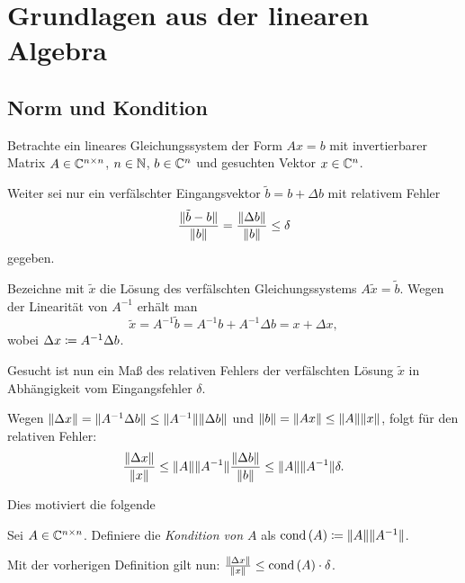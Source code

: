\chapter{Grundlagen aus der linearen Algebra}
\section{Norm und Kondition}

Betrachte ein lineares Gleichungssystem der Form
$Ax = b$ mit invertierbarer Matrix
$A \in \mathbb{C}^{n \times n}$, $n \in \mathbb{N}$, $b \in \mathbb{C}^n$
und gesuchten Vektor $x \in \mathbb{C}^n$.

Weiter sei nur ein verfälschter Eingangsvektor $\tilde{b} = b + \Delta b$
mit relativem Fehler
\[
    \frac{\lVert\tilde{b} - b\rVert}{\lVert b\rVert} = \frac{\lVert\Delta b\rVert}{\lVert b\rVert} \leq \delta
\]
gegeben.

Bezeichne mit $\tilde{x}$ die Lösung des verfälschten Gleichungssystems
$A \tilde{x} = \tilde{b}$.
Wegen der Linearität von $A^{-1}$ erhält man
\[
    \tilde{x} = A^{-1} \tilde{b} = A^{-1} b + A^{-1} \Delta b = x + \Delta x,
\]
wobei $\Delta x \coloneqq A^{-1} \Delta b$.

Gesucht ist nun ein Maß des relativen Fehlers der verfälschten Lösung
$\tilde{x}$ in Abhängigkeit vom Eingangsfehler $\delta$.

Wegen $ \lVert\Delta x\rVert = \lVert A^{-1} \Delta b\rVert \leq \lVert A^{-1}\rVert \lVert\Delta b\rVert $
und $ \lVert b\rVert = \lVert A x\rVert \leq \lVert A\rVert \lVert x\rVert $,
folgt für den relativen Fehler:
\[
    \frac{\lVert\Delta x\rVert}{\lVert x\rVert} \leq \lVert A\rVert \lVert A^{-1}\rVert \frac{\lVert\Delta b\rVert}{\lVert b\rVert} \leq \lVert A\rVert \lVert A^{-1}\rVert \delta.
\]

Dies motiviert die folgende
\begin{mydef}
    Sei $A \in \mathbb{C}^{n \times n}$.
    Definiere die \emph{Kondition von $A$} als $\text{cond}\left( A \right) \coloneqq \lVert A\rVert
    \lVert A^{-1}\rVert$.
\end{mydef}

\begin{remark}
    Mit der vorherigen Definition gilt nun: $ \frac{\lVert\Delta x\rVert}{\lVert x\rVert} \leq \text{cond}\left( A \right) \cdot \delta $.
\end{remark}


